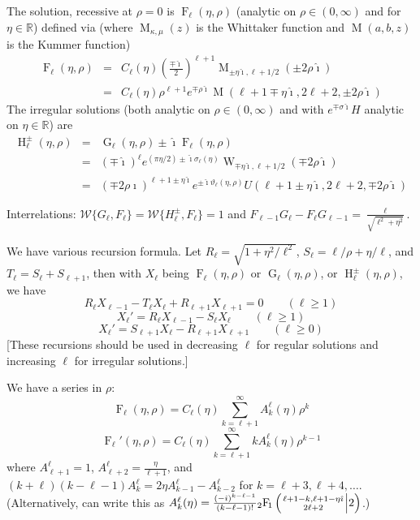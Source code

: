 \documentclass[10pt,dvipdfmx,letterpaper,twoside]{article}
\let\O=\operatorname
\newcommand{\RR}{{\mathbb{R}}}
\newcommand{\ii}{{\hat{\imath}}}
\newcommand{\Hyper}[5]{{\mathop{{}_{#1}\!\O{F\!}_{#2}\left({\genfrac{}{}{0pt}{}{#3}{#4}}\middle|{#5}\right)}}}
\let\kap=\kappa
\let\sig=\sigma
\let\theta=\vartheta
\begin{document}
The solution, recessive at $\rho=0$ is $\O{F}_\ell(\eta,\rho)$ (analytic on $\rho\in(0,\infty)$ and for $\eta\in\RR$)
defined via (where $\O{M}_{\kap,\mu}(z)$ is the Whittaker function and $\O{M}(a,b,z)$ is the Kummer function)
\begin{eqnarray*}
\O{F}_\ell(\eta,\rho)
    &=& C_\ell(\eta) \left(\frac{\mp\ii}{2}\right)^{\ell+1} \O{M}_{\pm\eta\ii, \ell+1/2}(\pm2\rho\ii) \\
    &=& C_\ell(\eta) \rho^{\ell+1} e^{\mp\rho\ii} \O{M}(\ell+1\mp\eta\ii, 2\ell+2, \pm2\rho\ii)
\end{eqnarray*}
The irregular solutions (both analytic on $\rho\in(0,\infty)$ and with $e^{\mp\sig\ii}H$ analytic on $\eta\in\RR$) are
\begin{eqnarray*}
\O{H}_\ell^\pm(\eta,\rho)
    &=& \O{G}_\ell(\eta,\rho) \pm \ii \O{F}_\ell(\eta,\rho) \\
    &=& (\mp\ii)^{\ell} e^{(\pi\eta/2)\pm\ii\sig_\ell(\eta)} \O{W}_{\mp\eta\ii, \ell+1/2}(\mp2\rho\ii) \\
    &=& (\mp2\rho\ii)^{\ell+1\pm\eta\ii} e^{\pm\ii\theta_\ell(\eta,\rho)} U(\ell+1\pm\eta\ii, 2\ell+2, \mp2\rho\ii)
\end{eqnarray*}

Interrelations:
$\mathcal{W}\{G_\ell,F_\ell\} = \mathcal{W}\{H^\pm_\ell, F_\ell\} = 1$
and
$F_{\ell-1} G_\ell - F_\ell G_{\ell-1} = \frac{\ell}{\sqrt{\ell^2+\eta^2}}$.

We have various recursion formula.  Let $R_\ell = \sqrt{1 + \eta^2/\ell^2}$, $S_\ell = \ell/\rho + \eta/\ell$, and $T_\ell=S_\ell + S_{\ell+1}$,
then with $X_\ell$ being $\O{F}_\ell(\eta,\rho)$ or $\O{G}_\ell(\eta,\rho)$, or $\O{H}_\ell^\pm(\eta,\rho)$, we have
\[ R_\ell X_{\ell-1} - T_\ell X_\ell + R_{\ell+1} X_{\ell+1} = 0 \qquad (\ell\geq1) \]
\[ X_\ell' = R_\ell X_{\ell-1} - S_\ell X_\ell \qquad (\ell\geq1) \]
\[ X_\ell' = S_{\ell+1} X_\ell - R_{\ell+1} X_{\ell+1} \qquad (\ell\geq0) \]
[These recursions should be used in decreasing $\ell$ for regular solutions and increasing $\ell$ for irregular solutions.]

We have a series in $\rho$:
\[ \O{F}_\ell(\eta,\rho) = C_\ell(\eta) \sum_{k=\ell+1}^\infty A^\ell_k(\eta) \rho^k \]
\[ \O{F}_\ell'(\eta,\rho) = C_\ell(\eta) \sum_{k=\ell+1}^\infty k A^\ell_k(\eta) \rho^{k-1} \]
where
$A^\ell_{\ell+1} = 1$, $A^\ell_{\ell+2} = \frac{\eta}{\ell+1}$, and
$(k+\ell)(k-\ell-1)A^\ell_k = 2\eta A^\ell_{k-1} - A^\ell_{k-2}$ for $k=\ell+3, \ell+4, \dots$.
(Alternatively, can write this as $A^\ell_k(\eta) = \frac{(-\ii)^{k-\ell-1}}{(k-\ell-1)!} \Hyper{2}{1}{\ell+1-k, \ell+1-\eta\ii}{2\ell+2}{2}$.)
\end{document}
